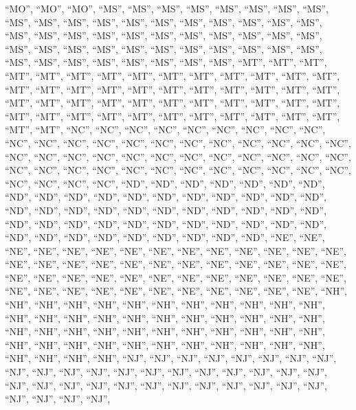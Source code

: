 \documentclass[
]{article}
\begin{document}
``MO'', ``MO'', ``MO'', ``MS'', ``MS'', ``MS'', ``MS'', ``MS'', ``MS'',
``MS'', ``MS'', ``MS'', ``MS'', ``MS'', ``MS'', ``MS'', ``MS'', ``MS'',
``MS'', ``MS'', ``MS'', ``MS'', ``MS'', ``MS'', ``MS'', ``MS'', ``MS'',
``MS'', ``MS'', ``MS'', ``MS'', ``MS'', ``MS'', ``MS'', ``MS'', ``MS'',
``MS'', ``MS'', ``MS'', ``MS'', ``MS'', ``MS'', ``MS'', ``MS'', ``MS'',
``MS'', ``MS'', ``MS'', ``MS'', ``MS'', ``MS'', ``MS'', ``MT'', ``MT'',
``MT'', ``MT'', ``MT'', ``MT'', ``MT'', ``MT'', ``MT'', ``MT'', ``MT'',
``MT'', ``MT'', ``MT'', ``MT'', ``MT'', ``MT'', ``MT'', ``MT'', ``MT'',
``MT'', ``MT'', ``MT'', ``MT'', ``MT'', ``MT'', ``MT'', ``MT'', ``MT'',
``MT'', ``MT'', ``MT'', ``MT'', ``MT'', ``MT'', ``MT'', ``MT'', ``MT'',
``MT'', ``MT'', ``MT'', ``MT'', ``MT'', ``MT'', ``MT'', ``MT'', ``MT'',
``MT'', ``MT'', ``NC'', ``NC'', ``NC'', ``NC'', ``NC'', ``NC'', ``NC'',
``NC'', ``NC'', ``NC'', ``NC'', ``NC'', ``NC'', ``NC'', ``NC'', ``NC'',
``NC'', ``NC'', ``NC'', ``NC'', ``NC'', ``NC'', ``NC'', ``NC'', ``NC'',
``NC'', ``NC'', ``NC'', ``NC'', ``NC'', ``NC'', ``NC'', ``NC'', ``NC'',
``NC'', ``NC'', ``NC'', ``NC'', ``NC'', ``NC'', ``NC'', ``NC'', ``NC'',
``NC'', ``NC'', ``NC'', ``NC'', ``NC'', ``NC'', ``ND'', ``ND'', ``ND'',
``ND'', ``ND'', ``ND'', ``ND'', ``ND'', ``ND'', ``ND'', ``ND'', ``ND'',
``ND'', ``ND'', ``ND'', ``ND'', ``ND'', ``ND'', ``ND'', ``ND'', ``ND'',
``ND'', ``ND'', ``ND'', ``ND'', ``ND'', ``ND'', ``ND'', ``ND'', ``ND'',
``ND'', ``ND'', ``ND'', ``ND'', ``ND'', ``ND'', ``ND'', ``ND'', ``ND'',
``ND'', ``ND'', ``ND'', ``ND'', ``ND'', ``ND'', ``ND'', ``ND'', ``ND'',
``ND'', ``NE'', ``NE'', ``NE'', ``NE'', ``NE'', ``NE'', ``NE'', ``NE'',
``NE'', ``NE'', ``NE'', ``NE'', ``NE'', ``NE'', ``NE'', ``NE'', ``NE'',
``NE'', ``NE'', ``NE'', ``NE'', ``NE'', ``NE'', ``NE'', ``NE'', ``NE'',
``NE'', ``NE'', ``NE'', ``NE'', ``NE'', ``NE'', ``NE'', ``NE'', ``NE'',
``NE'', ``NE'', ``NE'', ``NE'', ``NE'', ``NE'', ``NE'', ``NE'', ``NE'',
``NE'', ``NE'', ``NE'', ``NE'', ``NE'', ``NH'', ``NH'', ``NH'', ``NH'',
``NH'', ``NH'', ``NH'', ``NH'', ``NH'', ``NH'', ``NH'', ``NH'', ``NH'',
``NH'', ``NH'', ``NH'', ``NH'', ``NH'', ``NH'', ``NH'', ``NH'', ``NH'',
``NH'', ``NH'', ``NH'', ``NH'', ``NH'', ``NH'', ``NH'', ``NH'', ``NH'',
``NH'', ``NH'', ``NH'', ``NH'', ``NH'', ``NH'', ``NH'', ``NH'', ``NH'',
``NH'', ``NH'', ``NH'', ``NH'', ``NH'', ``NH'', ``NH'', ``NH'', ``NH'',
``NJ'', ``NJ'', ``NJ'', ``NJ'', ``NJ'', ``NJ'', ``NJ'', ``NJ'', ``NJ'',
``NJ'', ``NJ'', ``NJ'', ``NJ'', ``NJ'', ``NJ'', ``NJ'', ``NJ'', ``NJ'',
``NJ'', ``NJ'', ``NJ'', ``NJ'', ``NJ'', ``NJ'', ``NJ'', ``NJ'', ``NJ'',
``NJ'', ``NJ'', ``NJ'', ``NJ'', ``NJ'', ``NJ'', ``NJ'', ``NJ'', ``NJ'',
\end{document}
